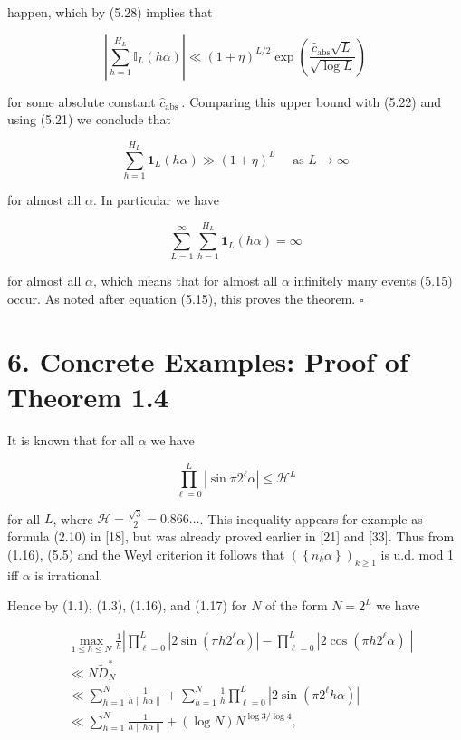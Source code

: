 \documentclass[10pt]{article}
\newcommand{\1}{\mathbf{1}}
\begin{document}
happen, which by (5.28) implies that

$$
\left|\sum_{h=1}^{H_{L}} \mathbb{I}_{L}(h \alpha)\right| \ll(1+\eta)^{L / 2} \exp \left(\frac{\hat{c}_{\mathrm{abs}} \sqrt{L}}{\sqrt{\log L}}\right)
$$

for some absolute constant $\hat{c}_{\text {abs }}$. Comparing this upper bound with (5.22) and using (5.21) we conclude that

$$
\sum_{h=1}^{H_{L}} \mathbf{1}_{L}(h \alpha) \gg(1+\eta)^{L} \quad \text { as } L \rightarrow \infty
$$

for almost all $\alpha$. In particular we have

$$
\sum_{L=1}^{\infty} \sum_{h=1}^{H_{L}} \mathbf{1}_{L}(h \alpha)=\infty
$$

for almost all $\alpha$, which means that for almost all $\alpha$ infinitely many events (5.15) occur. As noted after equation (5.15), this proves the theorem. \(\square\)

\section*{6. Concrete Examples: Proof of Theorem 1.4}
It is known that for all $\alpha$ we have


\begin{equation*}
\prod_{\ell=0}^{L}\left|\sin \pi 2^{\ell} \alpha\right| \leqslant \mathcal{H}^{L} \tag{6.1}
\end{equation*}


for all $L$, where $\mathcal{H}=\frac{\sqrt{3}}{2}=0.866 \ldots$. This inequality appears for example as formula (2.10) in [18], but was already proved earlier in [21] and [33]. Thus from (1.16), (5.5) and the Weyl criterion it follows that $\left(\left\{n_{k} \alpha\right\}\right)_{k \geqslant 1}$ is u.d. mod 1 iff $\alpha$ is irrational.

Hence by (1.1), (1.3), (1.16), and (1.17) for $N$ of the form $N=2^{L}$ we have

$$
\begin{aligned}
&\max_{1\leqslant h\leqslant N}\frac1h
 \left|\prod_{\ell=0}^{L}|2\sin(\pi h2^\ell\alpha)|
       -\prod_{\ell=0}^{L}|2\cos(\pi h2^\ell\alpha)|\right|\\
&\ll N\widetilde D_N^*\\
&\ll\sum_{h=1}^{N}\frac1{h\|h\alpha\|}
 +\sum_{h=1}^{N}\frac1h\prod_{\ell=0}^{L}|2\sin(\pi2^\ell h\alpha)|\\
&\ll\sum_{h=1}^{N}\frac1{h\|h\alpha\|}
 +(\log N)N^{\log3/\log4},
\end{aligned}
$$
\end{document}
